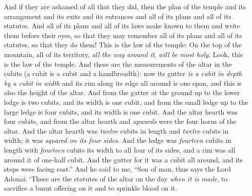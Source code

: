 \begin{biblechapter}
\verse And if they are ashamed of all that they did, then the plan of the temple and its arrangement and its exits and its entrances and all of its plans and all of its statutes. And all of its plans and all of its laws make known to them and write them before their eyes, so that they may remember all of its plans and all of its statutes, so that they do them!
\verse This is the law of the temple: On the top of the mountain, all of its territory, \textit{all the way around it}, \textit{will be most holy}. Look, this is the law of the temple.
\verse And these are the measurements of the altar in the cubits (a cubit is a cubit and a handbreadth): now its gutter \textit{is a cubit in depth by a cubit in width} and its rim along its edge all around is one span, and this is also the height of the altar.
\verse And from the gutter at the ground up to the lower ledge is two cubits, and its width is one cubit, and from the small ledge up to the large ledge is four cubits, and its width is one cubit.
\verse And the altar hearth was four cubits, and from the altar hearth and \textit{upwards} were the four horns of the altar.
\verse And the altar hearth was \textit{twelve} cubits in length and \textit{twelve} cubits in width; it was \textit{squared on its four sides}.
\verse And the ledge was \textit{fourteen} cubits in length with \textit{fourteen} cubits its width to all four of its sides, and a rim was all around it of one-half cubit. And the gutter for it was a cubit all around, and its steps were facing east.”
\verse And he said to me, “Son of man, thus says the Lord Adonai: ‘These are the statutes of the altar on the day \textit{when it is made}, to sacrifice a burnt offering on it and to sprinkle blood on it.

\end{biblechapter}
